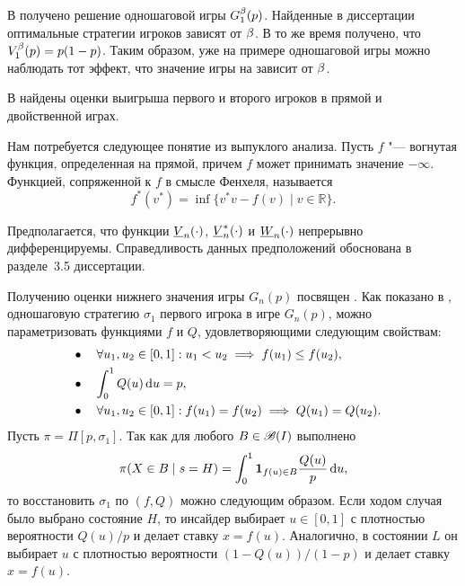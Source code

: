 В  получено решение одношаговой игры $G^{\beta}_1(p)$.
Найденные в диссертации оптимальные стратегии игроков зависят от $\beta$.
В то же время получено, что $V^{\beta}_1(p) = p(1-p)$.
Таким образом, уже на примере одношаговой игры можно наблюдать тот эффект, что значение игры на зависит от $\beta$.

В  найдены оценки выигрыша первого и второго игроков в прямой и двойственной играх.

Нам потребуется следующее понятие из выпуклого анализа.
Пусть $f$ "--- вогнутая функция, определенная на прямой, причем $f$ может принимать значение $-\infty$.
Функцией, сопряженной к $f$ в смысле Фенхеля, называется
\begin{equation*}
  f^*(v^*) = \inf \{ v^* v - f(v) \;|\; v \in \mathbb{R} \}.
\end{equation*}

Предполагается, что функции $\LV{n}(\cdot)$, $\LV[*]{n}(\cdot)$ и $\LW{n}(\cdot)$ непрерывно дифференцируемы.
Справедливость данных предположений обоснована в разделе~3.5 диссертации.

Получению оценки нижнего значения игры $G_n(p)$ посвящен .
Как показано в \cite{demeyer02}, одношаговую стратегию $\sigma_1$ первого игрока в игре $G_n(p)$, можно параметризовать функциями $f$ и $Q$, удовлетворяющими следующим свойствам:
\begin{subequations}
  \begin{flalign}
    \label{ch3:eq:parametr-prop:f-incr}
    &\bullet\quad \forall u_1, u_2 \in [0, 1]: u_1 < u_2 \implies f(u_1) \leq f(u_2),&\\
    \label{ch3:eq:parametr-prop:int-q=p}
    &\bullet\quad \int_0^1 Q(u) \mathop{}\!\mathrm{d} u = p,&\\
    \label{ch3:eq:parametr-prop:f-Q-eq}
    &\bullet\quad \forall u_1, u_2 \in [0, 1]: f(u_1) = f(u_2) \implies Q(u_1) = Q(u_2).&
  \end{flalign}
\end{subequations}
Пусть $\pi = \Pi[p, \sigma_1]$.
Так как для любого $B \in \mathscr{B}(I)$ выполнено
\begin{equation*}
  \pi(X \in B \; | \; s = H) = \int_0^1 \mathbf{1}_{f(u) \in B} \frac{Q(u)}{p} \mathop{}\!\mathrm{d} u,
\end{equation*}
то восстановить $\sigma_1$ по $(f, Q)$ можно следующим образом.
Если ходом случая было выбрано состояние $H$, то инсайдер выбирает $u \in [0, 1]$ с плотностью вероятности $Q(u)/p$ и делает ставку $x = f(u)$.
Аналогично, в состоянии $L$ он выбирает $u$ с плотностью вероятности $(1 - Q(u))/(1 - p)$ и делает ставку $x = f(u)$.

